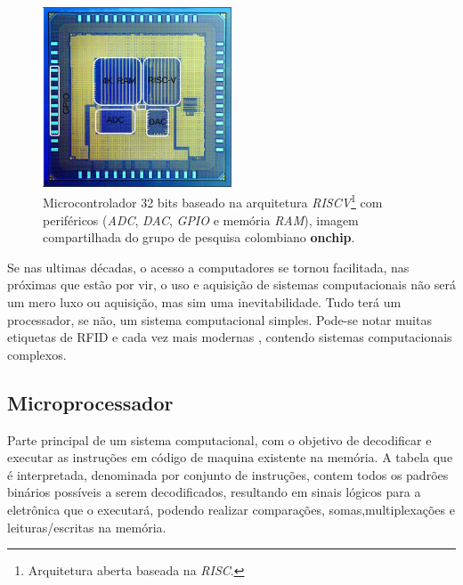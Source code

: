 

\begin{figure}[!htb]
  \centering
  \caption[Microcontrolador na pastilha de silício.]{Microcontrolador 32 bits baseado na arquitetura \textit{RISCV}\footnote{Arquitetura aberta baseada na \textit{RISC}.}
  com periféricos (\textit{ADC}, \textit{DAC}, \textit{GPIO} e memória \textit{RAM}), imagem compartilhada do grupo de pesquisa
  colombiano \textbf{onchip}.}
  \label{fig:ricv}
  \includegraphics[width=0.5\textwidth]{figuras/riscv.jpg}
\end{figure}


Se nas ultimas décadas, o acesso a computadores se tornou facilitada, nas próximas que estão por vir, o uso e aquisição de sistemas computacionais não será um mero luxo ou aquisição, mas sim uma inevitabilidade. Tudo terá um processador, se não, um sistema computacional simples. Pode-se notar muitas etiquetas de RFID e cada vez mais modernas \cite{ricci2008design}, contendo sistemas computacionais complexos.

\subsection{Microprocessador}

Parte principal de um sistema computacional, com o objetivo de decodificar e executar as instruções em código de maquina existente na memória. A tabela que é interpretada, denominada por conjunto de instruções, contem todos os padrões binários possíveis a serem decodificados, resultando em sinais lógicos para a eletrônica que o executará, podendo realizar comparações, somas,multiplexações e leituras/escritas na memória.

